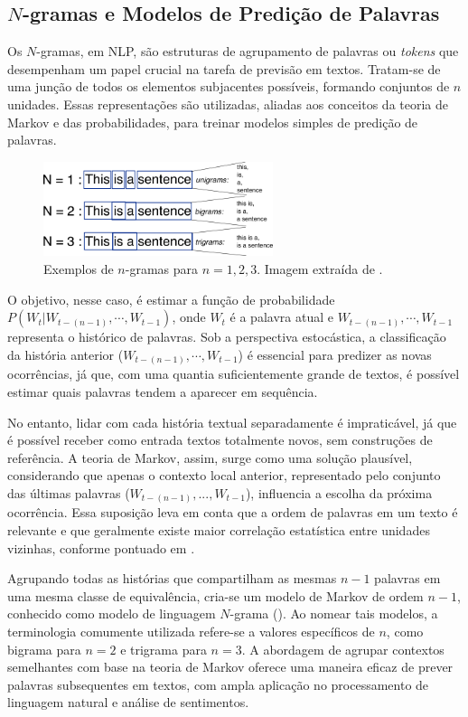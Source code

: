 \subsection{$N$-gramas e Modelos de Predição de Palavras}

Os $N$-gramas, em NLP, são estruturas de agrupamento de palavras ou \textit{tokens} que desempenham um papel crucial na tarefa de previsão em textos. Tratam-se de uma junção de todos os elementos subjacentes possíveis, formando conjuntos de $n$ unidades. Essas representações são utilizadas, aliadas aos conceitos da teoria de Markov e das probabilidades, para treinar modelos simples de predição de palavras.

\begin{figure}[H]
    \centering
    \caption{Exemplos de $n$-gramas para $n=1, 2, 3$. Imagem extraída de \cite{fasttext-2018}.}
    \label{fig:bigrama}
    \includegraphics[width=0.6\textwidth]{../figuras/ngrams.png}
\end{figure}

O objetivo, nesse caso, é estimar a função de probabilidade $P(W_t | W_{t-(n-1)}, \cdots, W_{t-1})$, onde $W_t$ é a palavra atual e $W_{t-(n-1)}, \cdots, W_{t-1}$ representa o histórico de palavras. Sob a perspectiva estocástica, a classificação da história anterior ($W_{t-(n-1)}, \cdots, W_{t-1}$) é essencial para predizer as novas ocorrências, já que, com uma quantia suficientemente grande de textos, é possível estimar quais palavras tendem a aparecer em sequência.

No entanto, lidar com cada história textual separadamente é impraticável, já que é possível receber como entrada textos totalmente novos, sem construções de referência. A teoria de Markov, assim, surge como uma solução plausível, considerando que apenas o contexto local anterior, representado pelo conjunto das últimas palavras ($W_{t-(n-1)}, ..., W_{t-1}$), influencia a escolha da próxima ocorrência. Essa suposição leva em conta que a ordem de palavras em um texto é relevante e que geralmente existe maior correlação estatística entre unidades vizinhas, conforme pontuado em \cite{bengio-et-al-2003}.

Agrupando todas as histórias que compartilham as mesmas $n - 1$ palavras em uma mesma classe de equivalência, cria-se um modelo de Markov de ordem $n - 1$, conhecido como modelo de linguagem $N$-grama (\cite{manning-schuetze-1999}). Ao nomear tais modelos, a terminologia comumente utilizada refere-se a valores específicos de $n$, como bigrama para $n=2$ e trigrama para $n=3$. A abordagem de agrupar contextos semelhantes com base na teoria de Markov oferece uma maneira eficaz de prever palavras subsequentes em textos, com ampla aplicação no processamento de linguagem natural e análise de sentimentos.

